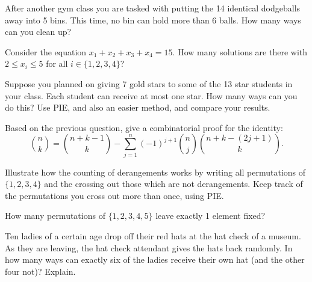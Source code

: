 \documentclass[10pt,]{book}
\theoremstyle{plain}
\theoremstyle{definition}
\theoremstyle{definition}
\theoremstyle{definition}
\theoremstyle{definition}
\numberwithin{equation}{chapter}
\begin{document}
\begin{divisionexercise}{3}\hypertarget{exercise-72}{}
\hypertarget{p-927}{}%
After another gym class you are tasked with putting the 14 identical dodgeballs away into 5 bins. This time, no bin can hold more than 6 balls. How many ways can you clean up?%
\end{divisionexercise}%
\begin{divisionexercise}{4}\hypertarget{exercise-73}{}
\hypertarget{p-929}{}%
Consider the equation \(x_1 + x_2 + x_3 + x_4 = 15\). How many solutions are there with \(2 \le x_i \le 5\) for all \(i \in \{1,2,3,4\}\)?%
\end{divisionexercise}%
\begin{divisionexercise}{5}\hypertarget{exercise-74}{}
\hypertarget{p-933}{}%
Suppose you planned on giving 7 gold stars to some of the 13 star students in your class. Each student can receive at most one star. How many ways can you do this? Use PIE, and also an easier method, and compare your results.%
\end{divisionexercise}%
\begin{divisionexercise}{6}\hypertarget{exercise-75}{}
\hypertarget{p-934}{}%
Based on the previous question, give a combinatorial proof for the identity:%
\begin{equation*}
{n \choose k} = {n+k-1 \choose k} - \sum_{j=1}^n (-1)^{j+1}{n \choose j}{n+k-(2j+1) \choose k}.
\end{equation*}
%
\end{divisionexercise}%
\begin{divisionexercise}{7}\hypertarget{exercise-76}{}
\hypertarget{p-935}{}%
Illustrate how the counting of derangements works by writing all permutations of \(\{1,2,3,4\}\) and the crossing out those which are not derangements. Keep track of the permutations you cross out more than once, using PIE.%
\end{divisionexercise}%
\begin{divisionexercise}{8}\hypertarget{exercise-77}{}
\hypertarget{p-937}{}%
How many permutations of \(\{1,2,3,4,5\}\) leave exactly 1 element fixed?%
\end{divisionexercise}%
\begin{divisionexercise}{9}\hypertarget{exercise-78}{}
\hypertarget{p-939}{}%
Ten ladies of a certain age drop off their red hats at the hat check of a museum. As they are leaving, the hat check attendant gives the hats back randomly. In how many ways can exactly six of the ladies receive their own hat (and the other four not)?  Explain.%
\end{divisionexercise}%
\end{document}
